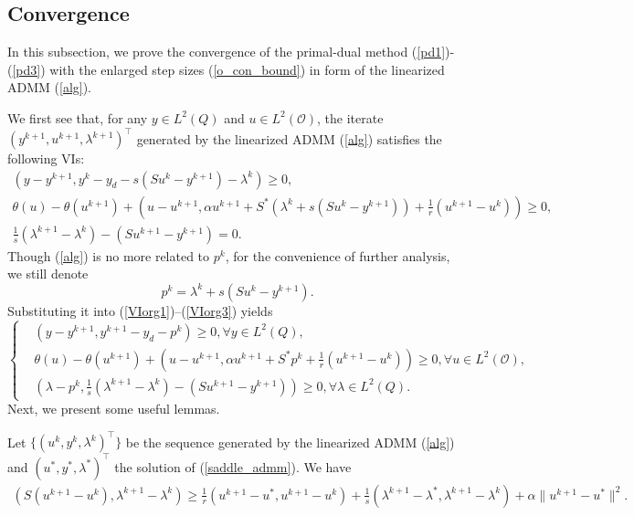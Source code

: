 \documentclass[final]{siamart171218}
\theoremstyle{remark}
\begin{document}
\subsection{Convergence}
In this subsection, we prove the convergence of the primal-dual method (\ref{pd1})-(\ref{pd3}) with the enlarged step sizes (\ref{o_con_bound}) in form of the linearized ADMM (\ref{alg}).

We first see that, for any $y \in L^2(Q)$ and $u\in L^2(\mathcal{O})$, the iterate $(y^{k+1}, u^{k+1}, \lambda^{k+1})^\top$ generated by the linearized ADMM (\ref{alg}) satisfies the following VIs:
{
	\begin{eqnarray}
		\left(y - y^{k+1}, y^k-y_d-s(Su^k -  y^{k+1})- \lambda^k \right) \geq 0, \label{VIorg1} \\
		\theta(u)-\theta(u^{k+1})+(u -  u^{k+1},  \alpha u^{k+1} + S^*\left(\lambda^k + s(Su^{k} - y^{k+1})\right)+ \frac{1}{r}( u^{k+1} - u^k) ) \geq 0,  \label{VIorg2} \\
		\frac{1}{s}(\lambda^{k+1} - \lambda^k) - (Su^{k+1} - y^{k+1}) = 0. \label{VIorg3}
	\end{eqnarray}
}
Though (\ref{alg}) is no more related to $p^k$, for the convenience of further analysis, we still denote
\begin{equation}
	\label{defpk}
	p^{k}= \lambda^k + s(Su^{k} - y^{k+1}).
\end{equation}
Substituting it into (\ref{VIorg1})--(\ref{VIorg3}) yields
\begin{equation}
	\label{VIkplus1}
	\left \{ \begin{aligned}
		& \left(y - y^{k+1},y^{k+1}-y_d -p^{k} \right) \geq 0, \forall y \in L^2(Q), \\
		& \theta(u)-\theta(u^{k+1})+\left(u -  u^{k+1}, \alpha u^{k+1} + S^*p^k + \frac{1}{r}( u^{k+1} - u^k) \right) \geq 0, \forall u\in L^2(\mathcal{O}), \\
		& \left(\lambda - p^{k},  \frac{1}{s}(\lambda^{k+1} - \lambda^k) - (Su^{k+1} - y^{k+1})\right) \geq 0, \forall \lambda \in L^2(Q).
	\end{aligned}
	\right.
\end{equation}
Next, we present some useful lemmas.

\begin{lemma}
	Let $\{(u^k, y^k, \lambda^k)^\top\}$ be the sequence generated by the linearized ADMM (\ref{alg}) and $(u^*, y^*, \lambda^*)^\top$ the solution of (\ref{saddle_admm}). We have
	\begin{equation}
	{\begin{aligned}
	\label{seqU}
	(S (u^{k+1}- u^k), \lambda^{k+1}-\lambda^k ) \geq \frac{1}{r}( u^{k+1} - u^*, u^{k +1} - u^k) + \frac{1}{s}( \lambda^{k+1} - \lambda^*,\lambda^{k+1} - \lambda^k) + \alpha \|u^{k+1}-u^*\|^2 .
	\end{aligned}}
	\end{equation}
\end{lemma}
\end{document}
